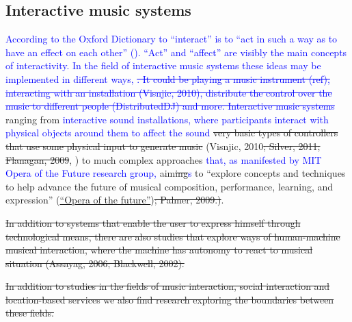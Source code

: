 \documentclass[a4paper,11pt]{article}
\newcommand{\new}[1]{\textcolor{blue}{#1}}
\begin{document}
\subsection{Interactive music systems}


\new{According to the Oxford Dictionary to ``interact'' is to ``act in such a way as to have an effect on each other'' (}\new{). ``Act'' and ``affect'' are visibly the main concepts of interactivity. In the field of interactive music systems these ideas may be implemented in different ways, \st{. It could be playing a music instrument (ref), interacting with an installation (Visnjic, 2010), distribute the control over the music to different people (DistributedDJ) and more. Interactive music systems}} ranging from \new{interactive sound installations, where participants interact with physical objects around them to affect the sound} \st{very basic types of controllers that use some physical input to generate music} (Visnjic, 2010\st{; Silver, 2011; Flanagan, 2009}, \href{http://createdigitalmusic.com/2012/10/at-musicmakers-experiencing-music-through-design-as-community-of-doers-collaborates-listen-watch/}{}) to much complex approaches \new{that, as manifested by MIT Opera of the Future research group,} aim\st{ing}\new{s} to ``explore concepts and techniques to help advance the future of musical composition, performance, learning, and expression'' (\href{http://www.media.mit.edu/research/groups/opera-future}{``Opera of the future''})\st{; Palmer, 2009.)}.


\st{In addition to systems that enable the user to express himself through technological means, there are also studies that explore ways of human-machine musical interaction, where the machine has autonomy to react to musical situation (Assayag, 2006; Blackwell, 2002).}

\st{In addition to studies in the fields of music interaction, social interaction and location-based services we also find research exploring the boundaries between these fields.}
\end{document}
